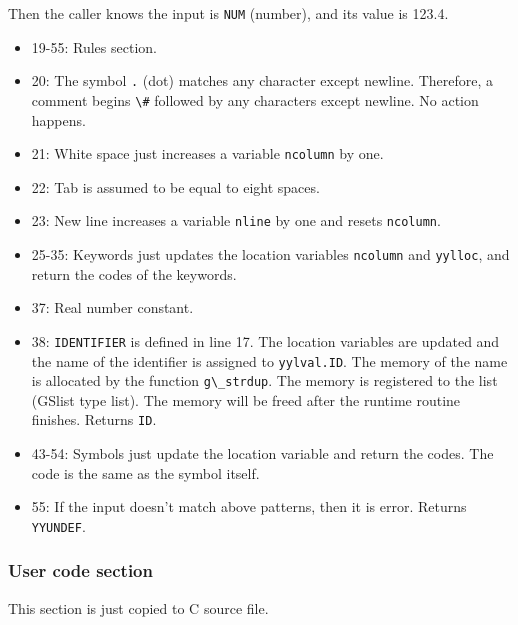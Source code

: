 Then the caller knows the input is \passthrough{\lstinline!NUM!}
(number), and its value is 123.4.

\begin{itemize}
\tightlist
\item
  19-55: Rules section.
\item
  20: The symbol \passthrough{\lstinline!.!} (dot) matches any character
  except newline. Therefore, a comment begins
  \passthrough{\lstinline!\#!} followed by any characters except
  newline. No action happens.
\item
  21: White space just increases a variable
  \passthrough{\lstinline!ncolumn!} by one.
\item
  22: Tab is assumed to be equal to eight spaces.
\item
  23: New line increases a variable \passthrough{\lstinline!nline!} by
  one and resets \passthrough{\lstinline!ncolumn!}.
\item
  25-35: Keywords just updates the location variables
  \passthrough{\lstinline!ncolumn!} and
  \passthrough{\lstinline!yylloc!}, and return the codes of the
  keywords.
\item
  37: Real number constant.
\item
  38: \passthrough{\lstinline!IDENTIFIER!} is defined in line 17. The
  location variables are updated and the name of the identifier is
  assigned to \passthrough{\lstinline!yylval.ID!}. The memory of the
  name is allocated by the function \passthrough{\lstinline!g\_strdup!}.
  The memory is registered to the list (GSlist type list). The memory
  will be freed after the runtime routine finishes. Returns
  \passthrough{\lstinline!ID!}.
\item
  43-54: Symbols just update the location variable and return the codes.
  The code is the same as the symbol itself.
\item
  55: If the input doesn't match above patterns, then it is error.
  Returns \passthrough{\lstinline!YYUNDEF!}.
\end{itemize}

\hypertarget{user-code-section}{%
\subsubsection{User code section}\label{user-code-section}}

This section is just copied to C source file.

